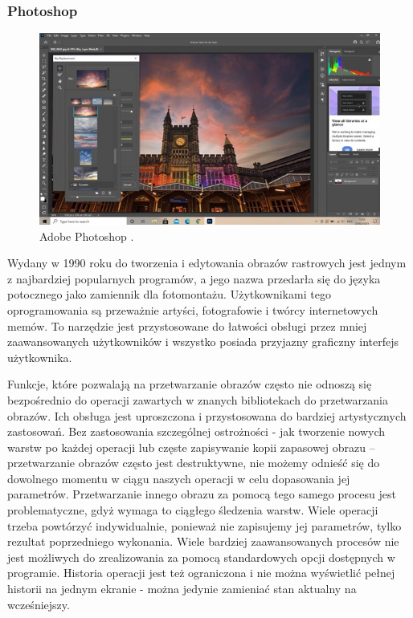 \subsubsection{Photoshop}
\begin{figure}[H]
    \centering
    \includegraphics{./images/Picture2.jpg}
    \caption{Adobe Photoshop \cite{photoshop}.}
    \label{fig:photoshop}
\end{figure}

Wydany w 1990 roku do tworzenia i edytowania obrazów rastrowych jest jednym z najbardziej popularnych programów, a jego nazwa przedarła się do języka potocznego jako zamiennik dla fotomontażu. 
Użytkownikami tego oprogramowania są przeważnie artyści, fotografowie i twórcy internetowych memów. 
To narzędzie jest przystosowane do łatwości obsługi przez mniej zaawansowanych użytkowników i wszystko posiada przyjazny graficzny interfejs użytkownika. 

Funkcje, które pozwalają na przetwarzanie obrazów często nie odnoszą się bezpośrednio do operacji zawartych w znanych bibliotekach do przetwarzania obrazów. 
Ich obsługa jest uproszczona i przystosowana do bardziej artystycznych zastosowań. 
Bez zastosowania szczególnej ostrożności - jak tworzenie nowych warstw po każdej operacji lub częste zapisywanie kopii zapasowej obrazu – przetwarzanie obrazów często jest destruktywne, nie możemy odnieść się do dowolnego momentu w ciągu naszych operacji w celu dopasowania jej parametrów. 
Przetwarzanie innego obrazu za pomocą tego samego procesu jest problematyczne, gdyż wymaga to ciągłego śledzenia warstw. Wiele operacji trzeba powtórzyć indywidualnie, ponieważ nie zapisujemy jej parametrów, tylko rezultat poprzedniego wykonania. Wiele bardziej zaawansowanych procesów nie jest możliwych do zrealizowania za pomocą standardowych opcji dostępnych w programie. Historia operacji jest też ograniczona i nie można wyświetlić pełnej historii na jednym ekranie - można jedynie zamieniać stan aktualny na wcześniejszy.

